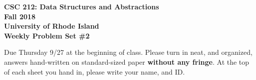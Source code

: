 \documentclass[11pt]{article}
\begin{document}
\thispagestyle{empty}

\begin{center}
    {\Large\bf CSC 212: Data Structures and Abstractions}\\
    \medskip
    {\Large\bf Fall 2018}\\
    \medskip
    {\Large\bf University of Rhode Island}\\
    \bigskip
    {\Large\bf Weekly Problem Set \#2}
\end{center}

Due Thursday 9/27 at the beginning of class. Please turn in neat, and organized, answers hand-written on standard-sized paper \textbf{without any fringe}. At the top of each sheet you hand in, please write your name, and ID.
\end{document}
